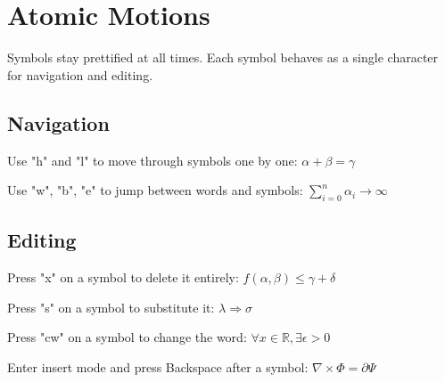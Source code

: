 \documentclass{article}
\begin{document}
\section{Atomic Motions}

Symbols stay prettified at all times.
Each symbol behaves as a single character for navigation and editing.

\subsection{Navigation}

Use "h" and "l" to move through symbols one by one:
$\alpha + \beta = \gamma$

Use "w", "b", "e" to jump between words and symbols:
$\sum_{i=0}^{n} \alpha_i \to \infty$

\subsection{Editing}

Press "x" on a symbol to delete it entirely:
$f(\alpha, \beta) \leq \gamma + \delta$

Press "s" on a symbol to substitute it:
$\lambda \Rightarrow \sigma$

Press "cw" on a symbol to change the word:
$\forall x \in \mathbb{R}, \exists \epsilon > 0$

Enter insert mode and press Backspace after a symbol:
$\nabla \times \Phi = \partial \Psi$
\end{document}
